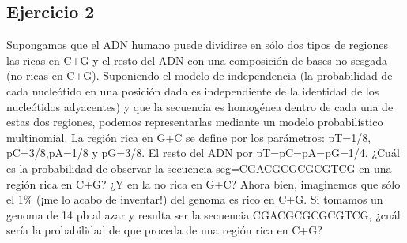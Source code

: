 \subsection{Ejercicio 2}
Supongamos que el ADN humano puede dividirse en sólo dos tipos de regiones las ricas en C+G y el resto del ADN con una composición de bases no sesgada (no ricas en C+G). Suponiendo el modelo de independencia (la probabilidad de cada nucleótido en una posición dada es independiente de la identidad de los nucleótidos adyacentes) y que la secuencia es homogénea dentro de cada una de estas dos regiones, podemos representarlas mediante un modelo probabilístico multinomial. La región rica en G+C se define por los parámetros: pT=1/8, pC=3/8,pA=1/8 y pG=3/8. El resto del ADN por pT=pC=pA=pG=1/4. ¿Cuál es la probabilidad de observar la secuencia seg=CGACGCGCGCGTCG en una región rica en C+G? ¿Y en la no rica en G+C? Ahora bien, imaginemos que sólo el 1\% (¡me lo acabo de inventar!) del genoma es rico en C+G. Si tomamos un genoma de 14 pb al azar y resulta ser la secuencia CGACGCGCGCGTCG, ¿cuál sería la probabilidad de que proceda de una región rica en C+G?
